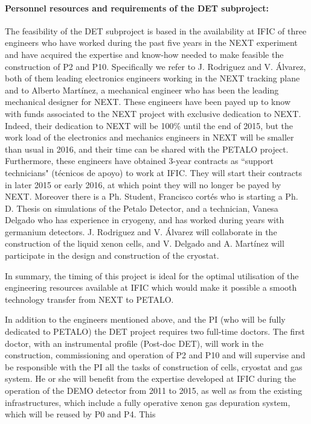 \paragraph{Personnel resources and requirements of the DET subproject:}

The feasibility of the DET subproject is based in the availability at IFIC of three engineers who have worked during the past five years in the NEXT experiment and have acquired the expertise and know-how needed to make feasible the construction of P2 and P10. Specifically we refer to J. Rodriguez and V. Álvarez, both of them leading electronics engineers working in the NEXT tracking plane and to Alberto Martínez, a mechanical engineer who has been the leading mechanical designer for NEXT.
These engineers have been payed up to know with funds associated to the NEXT project with exclusive dedication to NEXT. Indeed, their dedication to NEXT will be 100\% until the end of 2015, but the work load of the electronics and mechanics engineers in NEXT will be smaller than usual in 2016, and their time can be shared with the PETALO project. Furthermore, these engineers have obtained 3-year contracts as ``support technicians" (técnicos de apoyo) to work at IFIC. They will start their contracts in later 2015 or early 2016, at which point they will no longer be payed by NEXT. 
Moreover there is a Ph. Student, Francisco cortés who is starting a Ph. D. Thesis on simulations of the Petalo Detector, and a technician,  Vanesa Delgado who has experience in cryogeny, and has worked during years with germanium detectors. 
J. Rodriguez and V. Álvarez will collaborate in the construction of the liquid xenon cells, and  V. Delgado and A. Martínez  will participate in the design and construction of the cryostat.

In summary, the timing of this project is ideal for the optimal utilisation of the engineering resources available at IFIC which would make it possible a smooth technology transfer from NEXT to PETALO. 


In addition to the engineers mentioned above, and the PI (who will be fully dedicated to PETALO) the DET project requires two full-time doctors. The first doctor, with an instrumental profile (Post-doc DET), will work in the construction, commissioning and operation of P2 and P10 and will supervise and be responsible with the PI   all the tasks of construction of cells, cryostat and gas system. He or she will benefit from the expertise developed at IFIC during the operation of the DEMO detector from 2011 to 2015, as well as from the existing infrastructures, which include a fully operative xenon gas depuration system, which will be reused by P0 and P4. This 

